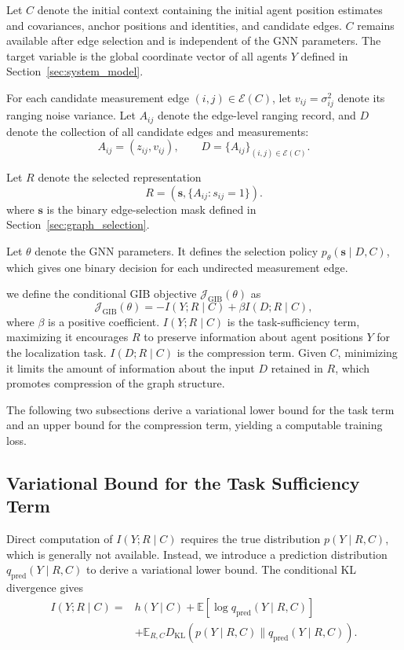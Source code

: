 {\color{blue}

Let $C$ denote the initial context containing the initial agent position estimates and covariances, anchor positions and identities, and candidate edges. $C$ remains available after edge selection and is independent of the GNN parameters. The target variable is the global coordinate vector of all agents $Y$ defined in Section~\ref{sec:system_model}.

For each candidate measurement edge $(i,j)\in\mathcal E(C)$, let $v_{ij}=\sigma_{ij}^{2}$ denote its ranging noise variance. Let $A_{ij}$ denote the edge-level ranging record, and $D$ denote the collection of all candidate edges and measurements:
\[
    A_{ij}=(z_{ij},v_{ij}),
    \qquad
    D=\{A_{ij}\}_{(i,j)\in\mathcal E(C)}.
\]

Let $R$ denote the selected representation
\[
    R=\left(\mathbf s,\{A_{ij}:s_{ij}=1\}\right).
\]
where $\mathbf s$ is the binary edge-selection mask defined in Section~\ref{sec:graph_selection}.

Let $\theta$ denote the GNN parameters. It defines the selection policy $p_\theta(\mathbf s\mid D,C)$, which gives one binary decision for each undirected measurement edge.

we define the conditional GIB objective $\mathcal J_{\mathrm{GIB}}(\theta)$ as
\begin{equation}
    \mathcal J_{\mathrm{GIB}}(\theta)
    =
    -I(Y;R\mid C)
    +\beta I(D;R\mid C),
    \label{eq:GIB_objective}
\end{equation}
where $\beta$ is a positive coefficient. $I(Y;R\mid C)$ is the task-sufficiency term, maximizing it encourages $R$ to preserve information about agent positions $Y$ for the localization task. $I(D;R\mid C)$ is the compression term. Given $C$, minimizing it limits the amount of information about the input $D$ retained in $R$, which promotes compression of the graph structure.

The following two subsections derive a variational lower bound for the task term and an upper bound for the compression term, yielding a computable training loss.

}

\subsection{Variational Bound for the Task Sufficiency Term}
\label{sec:task_sufficiency}
Direct computation of $I(Y;R\mid C)$ requires the true distribution $p(Y\mid R,C)$, which is generally not available. Instead, we introduce a prediction distribution $q_{\mathrm{pred}}(Y\mid R,C)$ to derive a variational lower bound. The conditional KL divergence gives
\begin{equation}
    \begin{aligned}
    I(Y;R\mid C)
    ={}& h(Y\mid C)
    +\mathbb{E}\!
    \left[\log q_{\mathrm{pred}}(Y\mid R,C)\right]\\
    &+\mathbb{E}_{R,C}
    D_{\mathrm{KL}}\!
    \left(
    p(Y\mid R,C)
    \parallel q_{\mathrm{pred}}(Y\mid R,C)
    \right).
    \end{aligned}
    \label{eq:task_kl_identity}
\end{equation}

